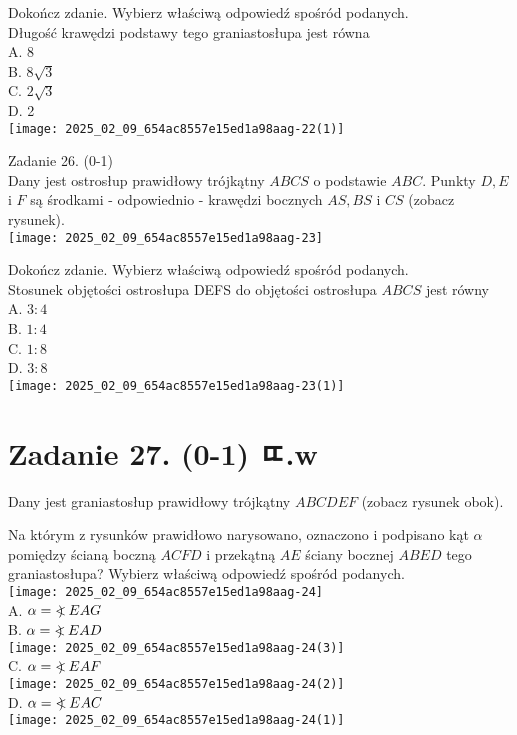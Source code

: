 \documentclass[10pt]{article}
\newcommand\Varangle{\mathop{{<\!\!\!\!\!\text{\small)}}\:}\nolimits}
\begin{document}
Dokończ zdanie. Wybierz właściwą odpowiedź spośród podanych.\\
Długość krawędzi podstawy tego graniastosłupa jest równa\\
A. 8\\
B. \(8 \sqrt{3}\)\\
C. \(2 \sqrt{3}\)\\
D. 2\\
\texttt{[image: 2025\_02\_09\_654ac8557e15ed1a98aag-22(1)]}

Zadanie 26. (0-1)\\
Dany jest ostrosłup prawidłowy trójkątny \(A B C S\) o podstawie \(A B C\). Punkty \(D, E\) i \(F\) są środkami - odpowiednio - krawędzi bocznych \(A S, B S\) i \(C S\) (zobacz rysunek).\\
\texttt{[image: 2025\_02\_09\_654ac8557e15ed1a98aag-23]}

Dokończ zdanie. Wybierz właściwą odpowiedź spośród podanych.\\
Stosunek objętości ostrosłupa DEFS do objętości ostrosłupa \(A B C S\) jest równy\\
A. \(3: 4\)\\
B. \(1: 4\)\\
C. \(1: 8\)\\
D. \(3: 8\)\\
\texttt{[image: 2025\_02\_09\_654ac8557e15ed1a98aag-23(1)]}

\section*{Zadanie 27. (0-1) ㄸ.w}
Dany jest graniastosłup prawidłowy trójkątny \(A B C D E F\) (zobacz rysunek obok).

Na którym z rysunków prawidłowo narysowano, oznaczono i podpisano kąt \(\alpha\) pomiędzy ścianą boczną \(A C F D\) i przekątną \(A E\) ściany bocznej \(A B E D\) tego graniastosłupa? Wybierz właściwą odpowiedź spośród podanych.\\
\texttt{[image: 2025\_02\_09\_654ac8557e15ed1a98aag-24]}\\
A. \(\alpha=\Varangle E A G\)\\
B. \(\alpha=\Varangle E A D\)\\
\texttt{[image: 2025\_02\_09\_654ac8557e15ed1a98aag-24(3)]}\\
C. \(\alpha=\Varangle E A F\)\\
\texttt{[image: 2025\_02\_09\_654ac8557e15ed1a98aag-24(2)]}\\
D. \(\alpha=\Varangle E A C\)\\
\texttt{[image: 2025\_02\_09\_654ac8557e15ed1a98aag-24(1)]}
\end{document}
